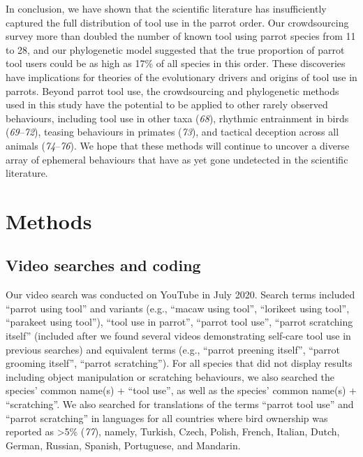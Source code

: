 \documentclass[
  man,floatsintext]{apa6}
\begin{document}
In conclusion, we have shown that the scientific literature has insufficiently
captured the full distribution of tool use in the parrot order. Our
crowdsourcing survey more than doubled the number of known tool using parrot
species from 11 to 28, and our phylogenetic model suggested that the true
proportion of parrot tool users could be as high as 17\% of all species in this
order. These discoveries have implications for theories of the evolutionary
drivers and origins of tool use in parrots. Beyond parrot tool use, the
crowdsourcing and phylogenetic methods used in this study have the potential to
be applied to other rarely observed behaviours, including tool use in other
taxa (\emph{68}), rhythmic entrainment in birds (\emph{69}--\emph{72}), teasing behaviours in primates (\emph{73}), and
tactical deception across all animals (\emph{74}--\emph{76}).
We hope that these methods will continue to uncover a diverse array of ephemeral
behaviours that have as yet gone undetected in the scientific literature.

\hypertarget{methods}{%
\section{Methods}\label{methods}}

\hypertarget{video-searches-and-coding}{%
\subsection{Video searches and coding}\label{video-searches-and-coding}}

Our video search was conducted on YouTube in July 2020. Search terms included
``parrot using tool'' and variants (e.g., ``macaw using tool'', ``lorikeet using
tool'', ``parakeet using tool''), ``tool use in parrot'', ``parrot tool use'', ``parrot
scratching itself'' (included after we found several videos demonstrating
self-care tool use in previous searches) and equivalent terms (e.g., ``parrot
preening itself'', ``parrot grooming itself'', ``parrot scratching''). For all
species that did not display results including object manipulation or scratching
behaviours, we also searched the species' common name(s) + ``tool use'', as well
as the species' common name(s) + ``scratching''. We also searched for translations
of the terms ``parrot tool use'' and ``parrot scratching'' in languages for all
countries where bird ownership was reported as \textgreater5\% (\emph{77}), namely,
Turkish, Czech, Polish, French, Italian, Dutch, German, Russian, Spanish,
Portuguese, and Mandarin.
\end{document}
